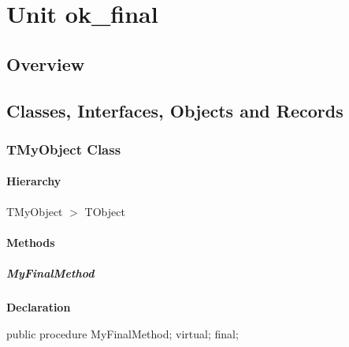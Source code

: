 \documentclass{report}
\newif\ifpdf
\begin{document}
\label{toc}\tableofcontents
\newpage
\newlength{\tmplength}
\chapter{Unit ok{\_}final}
\label{ok_final}
\section{Overview}
\begin{description}
\item[\texttt{\begin{ttfamily}TMyObject\end{ttfamily} Class}]
\end{description}
\section{Classes, Interfaces, Objects and Records}
\ifpdf
\subsection*{\large{\textbf{TMyObject Class}}\normalsize\hspace{1ex}\hrulefill}
\else
\subsection*{TMyObject Class}
\fi
\label{ok_final.TMyObject}
\subsubsection*{\large{\textbf{Hierarchy}}\normalsize\hspace{1ex}\hfill}
TMyObject {$>$} TObject
\subsubsection*{\large{\textbf{Methods}}\normalsize\hspace{1ex}\hfill}
\paragraph*{MyFinalMethod}\hspace*{\fill}

\label{ok_final.TMyObject-MyFinalMethod}
\begin{list}{}{
\setlength{\itemindent}{0cm}
\setlength{\listparindent}{0cm}
\setlength{\leftmargin}{\evensidemargin}
\addtolength{\leftmargin}{\tmplength}
\settowidth{\labelsep}{X}
\addtolength{\leftmargin}{\labelsep}
\setlength{\labelwidth}{\tmplength}
}
\item[\textbf{Declaration}\hfill]
\ifpdf
\begin{flushleft}
\fi
\begin{ttfamily}
public procedure MyFinalMethod; virtual; final;\end{ttfamily}

\ifpdf
\end{flushleft}
\fi

\end{list}
\end{document}
